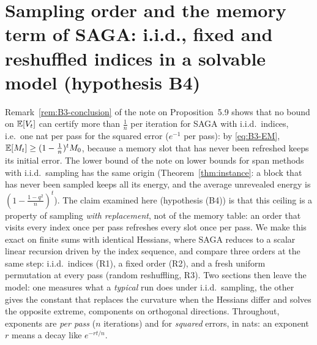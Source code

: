 \section{Sampling order and the memory term of SAGA: i.i.d., fixed and reshuffled indices in a solvable model (hypothesis B4)}
\label{sec:B4_sampling_order}
\providecommand{\Real}{\operatorname{Re}}

Remark~\ref{rem:B3-conclusion} of the note on Proposition~5.9 shows that no bound on $\mathbb{E}[V_t]$ can certify more than $\frac1n$ per iteration for SAGA with i.i.d.\ indices, i.e.\ one nat per pass for the squared error ($e^{-1}$ per pass): by \eqref{eq:B3-EM}, $\mathbb{E}[M_t]\ge(1-\frac1n)^tM_0$, because a memory slot that has never been refreshed keeps its initial error. The lower bound of the note on lower bounds for span methods with i.i.d.\ sampling has the same origin (Theorem~\ref{thm:instance}: a block that has never been sampled keeps all its energy, and the average unrevealed energy is $(1-\frac{1-q^2}n)^t$). The claim examined here (hypothesis (B4)) is that this ceiling is a property of sampling \emph{with replacement}, not of the memory table: an order that visits every index once per pass refreshes every slot once per pass. We make this exact on finite sums with identical Hessians, where SAGA reduces to a scalar linear recursion driven by the index sequence, and compare three orders at the same step: i.i.d.\ indices (R1), a fixed order (R2), and a fresh uniform permutation at every pass (random reshuffling, R3). Two sections then leave the model: one measures what a \emph{typical} run does under i.i.d.\ sampling, the other gives the constant that replaces the curvature when the Hessians differ and solves the opposite extreme, components on orthogonal directions. Throughout, exponents are \emph{per pass} ($n$ iterations) and for \emph{squared} errors, in nats: an exponent $r$ means a decay like $e^{-rt/n}$.


